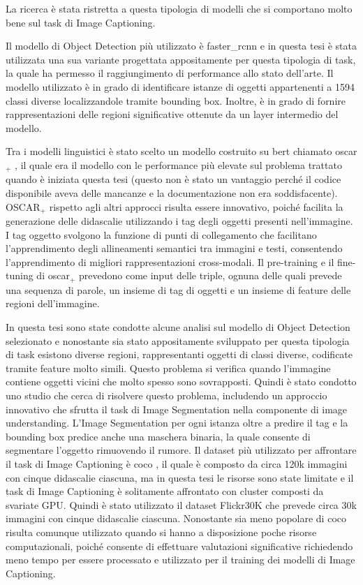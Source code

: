 La ricerca è stata ristretta a questa tipologia di modelli che si comportano molto bene sul task di Image Captioning.


Il modello di Object Detection più utilizzato è \acrshort{faster_rcnn} e in questa tesi è stata utilizzata una sua variante progettata appositamente per questa tipologia di task, la quale ha permesso il raggiungimento di performance allo stato dell'arte. Il modello utilizzato è in grado di identificare istanze di oggetti appartenenti a 1594 classi diverse localizzandole tramite bounding box. Inoltre, è in grado di fornire rappresentazioni delle regioni significative ottenute da un layer intermedio del modello.

Tra i modelli linguistici è stato scelto un modello costruito su \acrshort{bert} chiamato \acrshort{oscar}$_+$ \cite{li2020oscar, zhang2021vinvl}, il quale era il modello con le performance più elevate sul problema trattato quando è iniziata questa tesi (questo non è stato un vantaggio perché il codice disponibile aveva delle mancanze e la documentazione non era soddisfacente). OSCAR$_+$ rispetto agli altri approcci risulta essere innovativo, poiché facilita la generazione delle didascalie utilizzando i tag degli oggetti presenti nell'immagine.
I tag oggetto svolgono la funzione di punti di collegamento che facilitano l'apprendimento degli allineamenti semantici tra immagini e testi, consentendo l'apprendimento di migliori rappresentazioni cross-modali.
Il pre-training e il fine-tuning di \acrshort{oscar}$_+$ prevedono come input delle triple, ognuna delle quali prevede una sequenza di parole, un insieme di tag di oggetti e un insieme di feature delle regioni dell'immagine.


In questa tesi sono state condotte alcune analisi sul modello di Object Detection selezionato e nonostante sia stato appositamente sviluppato per questa tipologia di task esistono diverse regioni, rappresentanti oggetti di classi diverse, codificate tramite feature molto simili. Questo problema si verifica quando l'immagine contiene oggetti vicini che molto spesso sono sovrapposti. Quindi è stato condotto uno studio che cerca di risolvere questo problema, includendo un approccio innovativo che sfrutta il task di Image Segmentation nella componente di image understanding. L'Image Segmentation per ogni istanza oltre a predire il tag e la bounding box predice anche una maschera binaria, la quale consente di segmentare l'oggetto rimuovendo il rumore.
Il dataset più utilizzato per affrontare il task di Image Captioning è \acrshort{coco} \cite{lin2014microsoft}, il quale è composto da circa 120k immagini con cinque didascalie ciascuna, ma in questa tesi le risorse sono state limitate e il task di Image Captioning è solitamente affrontato con cluster composti da svariate GPU. Quindi è stato utilizzato il dataset Flickr30K \cite{young2014image} che prevede circa 30k immagini con cinque didascalie ciascuna. Nonostante sia meno popolare di \acrshort{coco} risulta comunque utilizzato quando si hanno a disposizione poche risorse computazionali, poiché consente di effettuare valutazioni significative richiedendo meno tempo per essere processato e utilizzato per il training dei modelli di Image Captioning.

